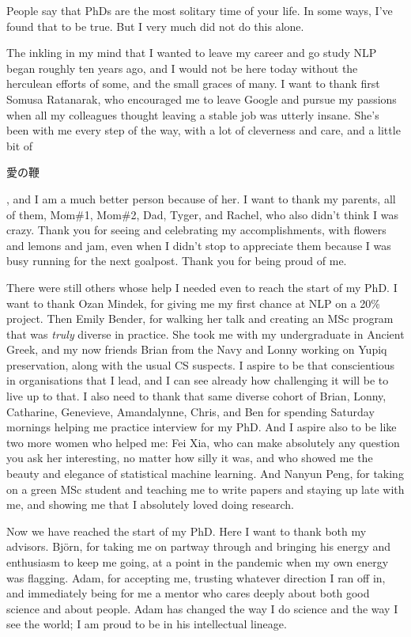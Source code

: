 \documentclass[phd,ilcc,oneside,leftchapter,parskip]{infthesis}
\begin{document}
\begin{preliminary}
\begin{laysummary}
\end{laysummary}

\begin{acknowledgements}
People say that PhDs are the most solitary time of your life. In some ways, I've found that to be true. But I very much did not do this alone. 

The inkling in my mind that I wanted to leave my career and go study NLP began roughly ten years ago, and I would not be here today without the herculean efforts of some, and the small graces of many. I want to thank first Somusa Ratanarak, who encouraged me to leave Google and pursue my passions when all my colleagues thought leaving a stable job was utterly insane. She's been with me every step of the way, with a lot of cleverness and care, and a little bit of \begin{CJK*}{UTF8}{ipxm} 愛の鞭 \end{CJK*}, 
and I am a much better person because of her. I want to thank my parents, all of them, Mom\#1, Mom\#2, Dad, Tyger, and Rachel, who also didn't think I was crazy. Thank you for seeing and celebrating my accomplishments, with flowers and lemons and jam, even when I didn't stop to appreciate them because I was busy running for the next goalpost. Thank you for being proud of me.

There were still others whose help I needed even to reach the start of my PhD. I want to thank Ozan Mindek, for giving me my first chance at NLP on a 20\% project. Then Emily Bender, for walking her talk and creating an MSc program that was \textit{truly} diverse in practice. She took me with my undergraduate in Ancient Greek, and my now friends Brian from the Navy and Lonny working on Yupiq preservation, along with the usual CS suspects. I aspire to be that conscientious in organisations that I lead, and I can see already how challenging it will be to live up to that. I also need to thank that same diverse cohort of Brian, Lonny, Catharine, Genevieve, Amandalynne, Chris, and Ben for spending Saturday mornings helping me practice interview for my PhD.
And I aspire also to be like two more women who helped me: Fei Xia, who can make absolutely any question you ask her interesting, no matter how silly it was, and who showed me the beauty and elegance of statistical machine learning. And Nanyun Peng, for taking on a green MSc student and teaching me to write papers and staying up late with me, and showing me that I absolutely loved doing research. 

Now we have reached the start of my PhD. Here I want to thank both my advisors. Björn, for taking me on partway through and bringing his energy and enthusiasm to keep me going, at a point in the pandemic when my own energy was flagging. Adam, for accepting me, trusting whatever direction I ran off in, and immediately being for me a mentor who cares deeply about both good science and about people. Adam has changed the way I do science and the way I see the world; I am proud to be in his intellectual lineage. 


\end{acknowledgements}
\end{preliminary}
\end{document}
